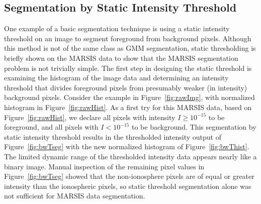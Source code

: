 \FloatBarrier
\subsection{Segmentation by Static Intensity Threshold}\label{sec:ApxSeg}
One example of a basic segmentation technique is using a static intensity threshold on an image to segment foreground from background pixels. 
Although this method is not of the same class as GMM segmentation, static thresholding is briefly shown on the MARSIS data to show that the MARSIS segmentation problem is not trivially simple. 
The first step in designing the static threshold is examining the histogram of the image data and determining an intensity threshold that divides foreground pixels from presumably weaker (in intensity) background pixels. 
Consider the example in Figure~\ref{fig:rawImg}, with normalized histogram in Figure~\ref{fig:rawHist}. 
As a first try for this MARSIS data, based on Figure~\ref{fig:rawHist}, we declare all pixels with intensity $I\geq10^{-15}$ to be foreground, and all pixels with $I<10^{-15}$ to be background. 
This segmentation by static intensity threshold results in the thresholded intensity output of Figure~\ref{fig:bwTseg} with the new normalized histogram of Figure~\ref{fig:bwThist}. 
The limited dynamic range of the thresholded intensity data appears nearly like a binary image. 
Manual inspection of the remaining pixel values in Figure~\ref{fig:bwTseg} showed that the non-ionosphere pixels are of equal or greater intensity than the ionospheric pixels, so static threshold segmentation alone was not sufficient for MARSIS data segmentation.

